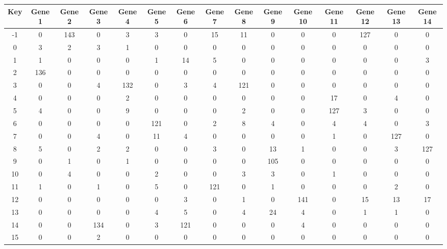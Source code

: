 \begin{tabular}{|c|c|c|c|c|c|c|c|c|c|c|c|c|c|c|}
\hline
Key & Gene 1 & Gene 2 & Gene 3 & Gene 4 & Gene 5 & Gene 6 & Gene 7 & Gene 8 & Gene 9 & Gene 10 & Gene 11 & Gene 12 & Gene 13 & Gene 14 \\
\hline
-1 & 0 & 143 & 0 & 3 & 3 & 0 & 15 & 11 & 0 & 0 & 0 & 127 & 0 & 0 \\
0 & 3 & 2 & 3 & 1 & 0 & 0 & 0 & 0 & 0 & 0 & 0 & 0 & 0 & 0 \\
1 & 1 & 0 & 0 & 0 & 1 & 14 & 5 & 0 & 0 & 0 & 0 & 0 & 0 & 3 \\
2 & 136 & 0 & 0 & 0 & 0 & 0 & 0 & 0 & 0 & 0 & 0 & 0 & 0 & 0 \\
3 & 0 & 0 & 4 & 132 & 0 & 3 & 4 & 121 & 0 & 0 & 0 & 0 & 0 & 0 \\
4 & 0 & 0 & 0 & 2 & 0 & 0 & 0 & 0 & 0 & 0 & 17 & 0 & 4 & 0 \\
5 & 4 & 0 & 0 & 9 & 0 & 0 & 0 & 2 & 0 & 0 & 127 & 3 & 0 & 0 \\
6 & 0 & 0 & 0 & 0 & 121 & 0 & 2 & 8 & 4 & 0 & 4 & 4 & 0 & 3 \\
7 & 0 & 0 & 4 & 0 & 11 & 4 & 0 & 0 & 0 & 0 & 1 & 0 & 127 & 0 \\
8 & 5 & 0 & 2 & 2 & 0 & 0 & 3 & 0 & 13 & 1 & 0 & 0 & 3 & 127 \\
9 & 0 & 1 & 0 & 1 & 0 & 0 & 0 & 0 & 105 & 0 & 0 & 0 & 0 & 0 \\
10 & 0 & 4 & 0 & 0 & 2 & 0 & 0 & 3 & 3 & 0 & 1 & 0 & 0 & 0 \\
11 & 1 & 0 & 1 & 0 & 5 & 0 & 121 & 0 & 1 & 0 & 0 & 0 & 2 & 0 \\
12 & 0 & 0 & 0 & 0 & 0 & 3 & 0 & 1 & 0 & 141 & 0 & 15 & 13 & 17 \\
13 & 0 & 0 & 0 & 0 & 4 & 5 & 0 & 4 & 24 & 4 & 0 & 1 & 1 & 0 \\
14 & 0 & 0 & 134 & 0 & 3 & 121 & 0 & 0 & 0 & 4 & 0 & 0 & 0 & 0 \\
15 & 0 & 0 & 2 & 0 & 0 & 0 & 0 & 0 & 0 & 0 & 0 & 0 & 0 & 0 \\
\hline
\end{tabular}